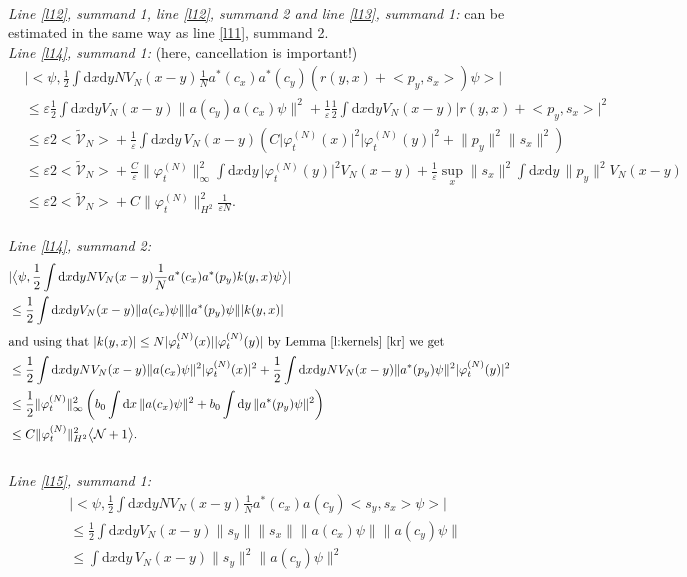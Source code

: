 \documentclass[11pt,a4paper,DIV11]{scrartcl}	%
\newcommand{\di}{\textrm{d}}		%
\newcommand{\Ncal}{\mathcal{N}}		%
\newcommand{\tilV}{\tilde{\mathcal{V}}_N}		%
\newcommand{\estlist}[2]{\emph{\vspace{.3em}\\Line \ref{l#1}, summand #2:}}
\newcommand{\nestlist}[2]{line \ref{l#1}, summand #2}
\newcommand{\Nestlist}[2]{Line \ref{l#1}, summand #2}
\newcommand{\scal}[2]{\big<#1,#2\big>} %
\newcommand{\norm}[1]{\lVert#1\rVert}	%
\newcommand{\ev}[1]{\big<#1\big>}	%
\newcommand{\ph}{\varphi_t^{(N)}}	%
\newcommand{\dxyNV}{\frac{1}{2}\int \di x\di y N V_N(x-y)} %
\newcommand{\dxyV}{\frac{1}{2}\int \di x\di y V_N(x-y)} %
\begin{document}
\begin{fleqn}[0.5em]
\emph{\vspace{.3em}\\\Nestlist{12}{1}, \nestlist{12}{2} and \nestlist{13}{1}:} can be estimated in the same way as \nestlist{11}{2}.\newline
\estlist{14}{1} (here, cancellation is important!)
\begin{align*}
& \lvert \scal{\psi}{\dxyNV \frac{1}{N}a^\ast(c_x) a^\ast(c_y) \left( r(y,x)+\scal{p_y}{s_x} \right)\psi} \rvert \\
& \leq \varepsilon \dxyV \norm{a(c_y)a(c_x)\psi}^2 + \frac{1}{\varepsilon} \dxyV \lvert r(y,x)+\scal{p_y}{s_x} \rvert^2 \\
& \leq \varepsilon 2\ev{\tilV} + \frac{1}{\varepsilon} \int \di x\di y\, V_N(x-y) \left( C\lvert\ph(x)\rvert^2\lvert\ph(y)\rvert^2 +\norm{p_y}^2\norm{s_x}^2 \right) \\
& \leq \varepsilon 2\ev{\tilV} + \frac{C}{\varepsilon} \norm{\ph}_\infty^2 \int \di x \di y\, \lvert \ph(y)\rvert^2 V_N(x-y) + \frac{1}{\varepsilon} \sup_x\norm{s_x}^2 \int \di x\di y\, \norm{p_y}^2 V_N(x-y) \\
& \leq \varepsilon 2\ev{\tilV} + C\norm{\ph}_{H^2}^2 \frac{1}{\varepsilon N}.
\end{align*}
\estlist{14}{2}
\begin{align*}
& \lvert \scal{\psi}{\dxyNV \frac{1}{N} a^\ast(c_x) a^\ast(p_y) k(y,x)\psi} \rvert \\
& \leq \dxyV \norm{a(c_x)\psi} \norm{a^\ast(p_y)\psi} \lvert k(y,x)\rvert \\
\intertext{and using that $\lvert k(y,x)\rvert \leq N\lvert \ph(x)\rvert\lvert \ph(y)\rvert$ by Lemma \ref{l:kernels} \ref{kr} we get}
& \leq \dxyNV \norm{a(c_x)\psi}^2 \lvert\ph(x)\rvert^2 + \dxyNV \norm{a^\ast(p_y)\psi}^2 \lvert \ph(y)\rvert^2\\
& \leq \frac{1}{2} \norm{\ph}_\infty^2 \left( b_0 \int \di x\,\norm{a(c_x)\psi}^2 + b_0 \int \di y\,\norm{a^\ast(p_y)\psi}^2 \right) \\
& \leq C \norm{\ph}_{H^2}^2 \ev{\Ncal+1}.
\end{align*}
\estlist{15}{1}
\begin{align*}
& \lvert \scal{\psi}{\dxyNV \frac{1}{N}a^\ast(c_x)a(c_y) \scal{s_y}{s_x}\psi} \rvert \\
& \leq \dxyV \norm{s_y} \norm{s_x} \norm{a(c_x)\psi} \norm{a(c_y)\psi} \\
& \leq \int \di x \di y\, V_N(x-y) \norm{s_y}^2 \norm{a(c_y)\psi}^2 \\

\end{align*}
\end{fleqn}
\end{document}
